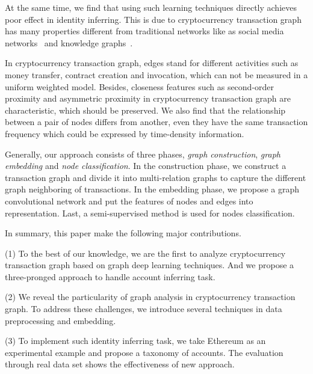 At the same time, we find that using such learning techniques directly achieves poor effect in identity inferring. This is due to cryptocurrency transaction graph has many properties different from traditional networks like as social media networks~\cite{geng2015learning} and knowledge graphs~\cite{bollacker2008freebase}.

 In cryptocurrency transaction graph, edges stand for different activities such as money transfer, contract creation and invocation, which can not be measured in a uniform weighted model. Besides, closeness features such as second-order proximity and asymmetric proximity in cryptocurrency transaction graph are characteristic, which should be preserved. We also find that the relationship between a pair of nodes differs from another, even they have the same transaction frequency which could be expressed by time-density information.

Generally, our approach consists of three phases, \emph{graph construction}, \emph{graph embedding} and \emph{node classification}. In the construction phase, we construct a transaction graph and divide it into multi-relation graphs to capture the different graph neighboring of transactions. In the embedding phase, we propose a graph convolutional network and put the features of nodes and edges into representation. Last, a semi-supervised method is used for nodes classification.

In summary, this paper make the following major contributions.

(1) To the best of our knowledge, we are the first to analyze cryptocurrency transaction graph based on graph deep learning techniques. And we propose a three-pronged approach to handle account inferring task.

(2) We reveal the particularity of graph analysis in cryptocurrency transaction graph. To address these challenges, we introduce several techniques in data preprocessing and embedding.

(3) To implement such identity inferring task, we take Ethereum as an experimental example and propose a taxonomy of accounts. The evaluation through real data set shows the effectiveness of new approach.




